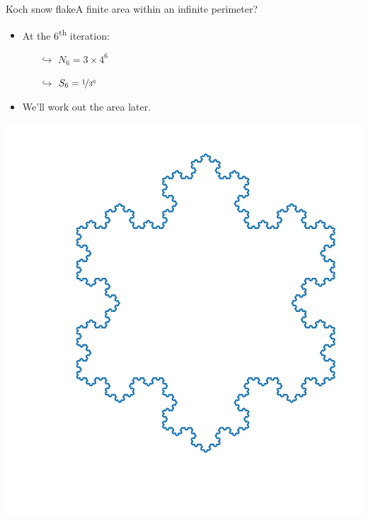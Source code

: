 \documentclass[usenames,dvipsnames,svgnames,10pt,aspectratio=169]{beamer}
\begin{document}
\begin{frame}[t, c]{Koch snow flake}{A finite area within an infinite perimeter?}
	\centering
	\begin{minipage}{.48\textwidth}
		\begin{itemize}
			\item At the 6\textsuperscript{th} iteration:
			\begin{itemize}
				\item[$\hookrightarrow$] $N_6 = 3 \times 4^6$
				\item[$\hookrightarrow$] $S_6 = \nicefrac{1}{3^6}$
			\end{itemize}

			\bigskip

			\item We'll work out the area later.
		\end{itemize}
	\end{minipage}%
	\hfill
	\begin{minipage}{.48\textwidth}
		\centering
		\includegraphics[width=.8\textwidth]{koch_6_it}
	\end{minipage}

	\vspace{1cm}
\end{frame}
\end{document}
